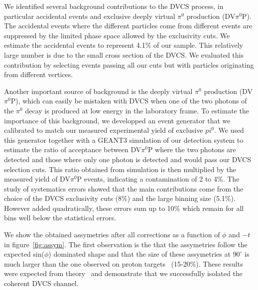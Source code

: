 \documentclass[%
 reprint,
 amsmath,amssymb,
 aps,
]{revtex4-1}
\begin{document}
We identified several background contributions to the DVCS process, in 
particular accidental events and exclusive deeply virtual 
$\pi^0$ production (DV$\pi^0$P). The accidental
events where the different particles come from different events are 
suppressed by the limited phase space allowed by the exclusivity cuts. We 
estimate the accidental events to represent 4.1\% of our sample. This 
relatively large number is due to the small cross section of the DVCS. We 
evaluated this contribution by selecting events passing all our cuts but with 
particles originating from different vertices. 

Another important source of background is the deeply virtual 
$\pi^0$ production (DV$\pi^0$P), which can easily be mistaken
with DVCS when one of the two photons of the $\pi^0$ decay is produced at
low energy in the laboratory frame. To estimate the importance of
this background, we developped an event generator 
that we calibrated to match our measured experimental yield of exclusive 
$pi^0$. We used this generator together 
with a GEANT3 simulation of our detection system to estimate the ratio 
of acceptance between DV$\pi^0$P where the two photons are detected and those
where only one photon is detected and would pass our 
DVCS selection cuts. This ratio obtained from simulation is then multiplied by 
the measured yield of DV$\pi^0$P events, indicating a contamination of 2 to 4\%. 
The study of systematics errors showed that the main contributions come from 
the choice of the DVCS exclusivity cuts (8\%) and the large binning size 
(5.1\%). However added quadratically, these errors sum up to 10\% which remain 
for all bins well below the statistical errors.


We show the obtained assymetries after all corrections as a function of 
$\phi$ and $-t$ in figure~\ref{fig:assym}. The first observation is the
that the assymetries follow the expected sin($\phi$) dominated shape
and that the size of these assymetries at $90^\circ$ is much larger than the one
observed on proton targets~\cite{} (15-20\%). These results were expected from 
theory~\cite{} and demonstrate that we successfully isolated the coherent
DVCS channel.
\end{document}
